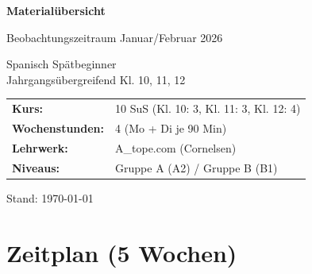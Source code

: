 \documentclass[11pt, a4paper]{article}
\begin{document}

\begin{center}
\vspace*{2cm}

{\Huge\bfseries\color{spanisch} Materialübersicht}

\vspace{0.5cm}

{\Large Beobachtungszeitraum Januar/Februar 2026}

\vspace{1cm}

{\large Spanisch Spätbeginner\\
Jahrgangsübergreifend Kl. 10, 11, 12\\
}

\vspace{2cm}


\vspace{2cm}

\begin{tabular}{ll}
\textbf{Kurs:} & 10 SuS (Kl. 10: 3, Kl. 11: 3, Kl. 12: 4) \\
\textbf{Wochenstunden:} & 4 (Mo + Di je 90 Min) \\
\textbf{Lehrwerk:} & A\_tope.com (Cornelsen) \\
\textbf{Niveaus:} & Gruppe A (A2) / Gruppe B (B1) \\
\end{tabular}

\vfill

{\small Stand: \today}

\end{center}

\newpage


\section*{Zeitplan (5 Wochen)}
\end{document}
